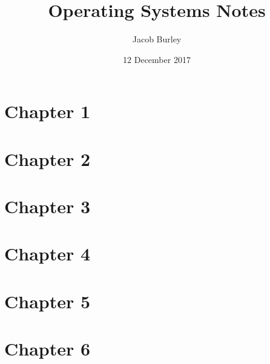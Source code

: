 \documentclass{article}
\title{Operating Systems Notes}
\author{Jacob Burley}
\date{12 December 2017}
\begin{document}
\maketitle
\section*{Chapter 1}

\section*{Chapter 2}

\section*{Chapter 3}

\section*{Chapter 4}

\section*{Chapter 5}

\section*{Chapter 6}
\end{document}
